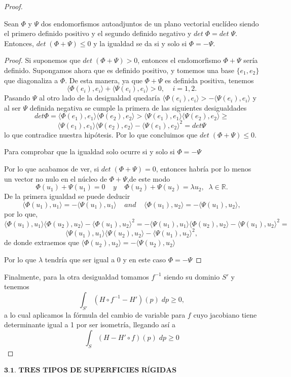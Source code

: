 \begin{proof}
	\begin{lema} \label{lem:lema2}
		Sean $\Phi$ y $\Psi$ dos endomorfismos autoadjuntos de un plano vectorial euclídeo siendo el primero definido positivo y el segundo definido negativo y $det \; \Phi = det \; \Psi$. Entonces, $det \; (\Phi + \Psi) \leq 0$ y la igualdad se da si y solo si $\Phi = - \Psi$.
	\end{lema}
	\begin{proof}
		Si suponemos que $det \; (\Phi + \Psi) > 0$, entonces el endomorfismo $\Phi + \Psi$ sería definido. Supongamos ahora que es definido positivo, y tomemos una base $\{ e_1, e_2 \}$ que diagonaliza a $\Phi$. De esta manera, ya que $\Phi + \Psi$ es definida positiva, tenemos
		\[
				\langle \Phi(e_i), e_i \rangle + \langle \Psi(e_i), e_i \rangle > 0, \;\;\;\; i = 1, 2.
		\]
		Pasando $\Psi$ al otro lado de la desigualdad quedaría $\langle \Phi(e_i), e_i \rangle  > -\langle \Psi(e_i), e_i \rangle$ y al ser $\Psi$ definida negativa se cumple la primera de las siguientes desigualdades
		$$
			det \Phi = \langle \Phi(e_1), e_1 \rangle \langle \Phi(e_2), e_2 \rangle > \langle \Psi(e_1), e_1 \rangle \langle \Psi(e_2), e_2 \rangle \geq $$
			$$ \langle \Psi(e_1), e_1 \rangle \langle \Psi(e_2), e_2 \rangle - \langle \Psi(e_1), e_2 \rangle^2 = det \Psi
		$$
		lo que contradice nuestra hipótesis. Por lo que concluimos que $ det \; (\Phi + \Psi) \leq 0$.
		
		Para comprobar que la igualdad solo ocurre si y solo si $\Phi = -\Psi$
		
		Por lo que acabamos de ver, si $det \; (\Phi + \Psi) = 0$, entonces habría por lo menos un vector no nulo en el núcleo de $\Phi + \Psi$,de este modo
		\[
			\Phi(u_1) + \Psi(u_1) = 0 \;\;\;\; y \;\;\;\; \Phi(u_2) + \Psi(u_2) = \lambda u_2, \;\; \lambda \in \mathbb{R}.
		\]
		De la primera igualdad se puede deducir
		$$ \langle \Phi(u_1), u_1 \rangle = - \langle \Psi(u_1), u_1 \rangle \;\;\;\; and \;\;\;\; \langle \Phi(u_1), u_2 \rangle = - \langle \Psi(u_1), u_2 \rangle, $$
		por lo que,
		$$ \langle \Phi(u_1),u_1\rangle \langle \Phi(u_2),u_2\rangle - \langle \Phi(u_1),u_2\rangle^2 =  -\langle \Psi(u_1),u_1\rangle \langle \Phi(u_2),u_2\rangle - \langle \Psi(u_1),u_2\rangle^2 = $$ $$ \langle \Psi(u_1),u_1\rangle \langle \Psi(u_2),u_2\rangle -\langle \Psi(u_1),u_2\rangle^2, $$
		de donde extraemos que $ \langle \Phi(u_2),u_2\rangle = -\langle \Psi(u_2),u_2\rangle $
		
		Por lo que $\lambda$ tendría que ser igual a $0$ y en este caso $\Phi = -\Psi$
		
	\end{proof}
	
	Finalmente, para la otra desigualdad tomamos $f^{-1}$ siendo su dominio $S'$ y tenemos
	\[
		\int_{S'} (H \circ f^{-1} - H')(p) \; dp \geq 0,
	\]
	a lo cual aplicamos la fórmula del cambio de variable para $f$ cuyo jacobiano tiene determinante igual a 1 por ser isometría, llegando así a
	\[
		\int_S (H - H' \circ f) (p) \; dp \geq 0
	\]
\end{proof}
${ }$\\



${ }$\\
$\textbf{3.1. TRES TIPOS DE SUPERFICIES RÍGIDAS}$
${ }$\\